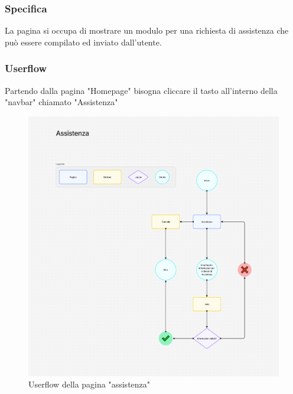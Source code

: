 \documentclass{report}
\begin{document}
\subsubsection*{Specifica}
La pagina si occupa di mostrare un modulo per una richiesta di assistenza che può essere compilato ed inviato dall'utente.\\ 

\subsubsection*{Userflow}
Partendo dalla pagina "Homepage" bisogna cliccare il tasto all'interno della "navbar" chiamato "Assistenza"
\begin{figure}[H]
	\centering\includegraphics[width=1\textwidth]{images/microservizio-home/frontend/assistenza-userflow.png}
	Userflow della pagina "assistenza"
\end{figure}
\end{document}
